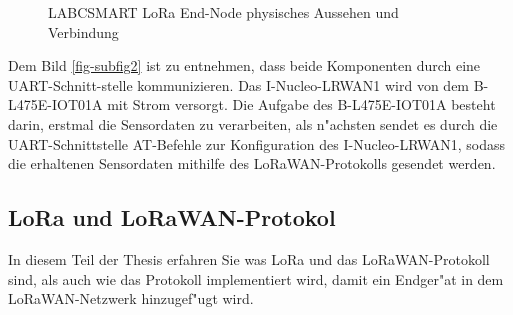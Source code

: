 \begin{figure}[h!]
	\centering
	\caption{LABCSMART LoRa End-Node physisches Aussehen 
	 und Verbindung 
	\label{fig:loranode}}
\end{figure}

Dem Bild \ref{fig-subfig2} ist zu entnehmen, dass beide Komponenten 
durch eine UART-Schnitt-stelle kommunizieren. Das I-Nucleo-LRWAN1 wird 
von dem  B-L475E-IOT01A mit Strom versorgt. Die Aufgabe des 
B-L475E-IOT01A besteht darin, erstmal die Sensordaten zu verarbeiten, 
als n"achsten sendet es durch die UART-Schnittstelle AT-Befehle zur 
Konfiguration des I-Nucleo-LRWAN1, sodass die erhaltenen Sensordaten 
mithilfe des LoRaWAN-Protokolls gesendet werden. 

\subsection{LoRa und LoRaWAN-Protokol}\label{LoRaWAN_P}

In diesem Teil der Thesis erfahren Sie was LoRa und das 
LoRaWAN-Protokoll sind, als auch wie das Protokoll implementiert wird, 
damit ein Endger"at in dem LoRaWAN-Netzwerk hinzugef"ugt wird.

